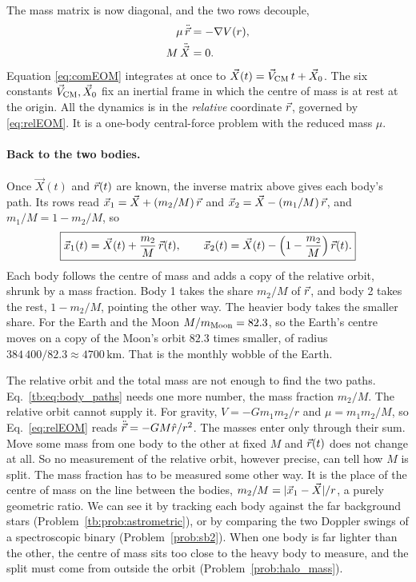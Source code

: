 	The mass matrix is now diagonal, and the two rows decouple,
	\begin{align}
		\mu\,\ddot{\vec r} &= -\nabla V(r), \label{eq:relEOM}\\
		M\,\ddot{\vec X} &= 0. \label{eq:comEOM}
	\end{align}
	Equation \eqref{eq:comEOM} integrates at once to $\vec X(t) = \vec V_{\rm CM}\,t+\vec X_0$. The six constants $\vec V_{\rm CM},\vec X_0$ fix an inertial frame in which the centre of mass is at rest at the origin. All the dynamics is in the \emph{relative} coordinate $\vec r$, governed by \eqref{eq:relEOM}. It is a one-body central-force problem with the reduced mass $\mu$.

	\paragraph{Back to the two bodies.} Once $\vec X(t)$ and $\vec r(t)$ are known, the inverse matrix above gives each body's path. Its rows read $\vec x_1=\vec X+(m_2/M)\,\vec r$ and $\vec x_2=\vec X-(m_1/M)\,\vec r$, and $m_1/M=1-m_2/M$, so
	\begin{equation}
		\boxed{\vec x_1(t)=\vec X(t)+\frac{m_2}{M}\,\vec r(t),\qquad \vec x_2(t)=\vec X(t)-\left(1-\frac{m_2}{M}\right)\vec r(t).}
		\label{tb:eq:body_paths}
	\end{equation}
	Each body follows the centre of mass and adds a copy of the relative orbit, shrunk by a mass fraction. Body 1 takes the share $m_2/M$ of $\vec r$, and body 2 takes the rest, $1-m_2/M$, pointing the other way. The heavier body takes the smaller share. For the Earth and the Moon $M/m_{\rm Moon}=82.3$, so the Earth's centre moves on a copy of the Moon's orbit $82.3$ times smaller, of radius $384\,400/82.3\approx4700\,\mathrm{km}$. That is the monthly wobble of the Earth.

	The relative orbit and the total mass are not enough to find the two paths. Eq.~\eqref{tb:eq:body_paths} needs one more number, the mass fraction $m_2/M$. The relative orbit cannot supply it. For gravity, $V=-Gm_1m_2/r$ and $\mu=m_1m_2/M$, so Eq.~\eqref{eq:relEOM} reads $\ddot{\vec r}=-GM\hat r/r^2$. The masses enter only through their sum. Move some mass from one body to the other at fixed $M$ and $\vec r(t)$ does not change at all. So no measurement of the relative orbit, however precise, can tell how $M$ is split. The mass fraction has to be measured some other way. It is the place of the centre of mass on the line between the bodies, $m_2/M=|\vec x_1-\vec X|/r$, a purely geometric ratio. We can see it by tracking each body against the far background stars (Problem~\ref{tb:prob:astrometric}), or by comparing the two Doppler swings of a spectroscopic binary (Problem~\ref{prob:sb2}). When one body is far lighter than the other, the centre of mass sits too close to the heavy body to measure, and the split must come from outside the orbit (Problem~\ref{prob:halo_mass}).

